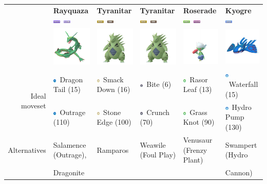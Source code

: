 \documentclass[8pt,aspectratio=169,compress]{beamer}
\newcommand{\darkfull}{\includegraphics[height=0.15cm]{../../images/type/full/Dark.png}}
\newcommand{\flyingfull}{\includegraphics[height=0.15cm]{../../images/type/full/Flying.png}}
\newcommand{\dragonfull}{\includegraphics[height=0.15cm]{../../images/type/full/Dragon.png}}
\newcommand{\grassfull}{\includegraphics[height=0.15cm]{../../images/type/full/Grass.png}}
\newcommand{\rockfull}{\includegraphics[height=0.15cm]{../../images/type/full/Rock.png}}
\newcommand{\waterfull}{\includegraphics[height=0.15cm]{../../images/type/full/Water.png}}
\newcommand{\poisonfull}{\includegraphics[height=0.15cm]{../../images/type/full/Poison.png}}
\newcommand{\dragonsimp}{\includegraphics[height=0.15cm]{../../images/type/simplified/dragon.png}}
\newcommand{\darksimp}{\includegraphics[height=0.15cm]{../../images/type/simplified/dark.png}}
\newcommand{\rocksimp}{\includegraphics[height=0.15cm]{../../images/type/simplified/rock.png}}
\newcommand{\watersimp}{\includegraphics[height=0.15cm]{../../images/type/simplified/water.png}}
\newcommand{\grasssimp}{\includegraphics[height=0.15cm]{../../images/type/simplified/grass.png}}
\begin{document}
\begin{frame}
\begin{tiny}
\begin{block}{}
\begin{center}
\bigskip

\begin{tabular}{rp{2cm}p{2cm}p{2cm}p{2cm}p{2cm}} 
    & \textbf{Rayquaza} \hfill \dragonfull~\flyingfull &  \textbf{Tyranitar} \hfill \rockfull~\darkfull &  \textbf{Tyranitar} \hfill \rockfull~\darkfull  &  \textbf{Roserade} \hfill \grassfull~\poisonfull  & \textbf{Kyogre} \hfill  \waterfull \\ 
    &  \multicolumn{1}{c}{\includegraphics[width=2cm]{../../images/pokemon/Rayquaza}} &   \multicolumn{1}{c}{\includegraphics[width=2cm]{../../images/pokemon/Tyranitar} }  &   \multicolumn{1}{c}{\includegraphics[width=2cm]{../../images/pokemon/Tyranitar} }   &   \multicolumn{1}{c}{\includegraphics[width=2cm]{../../images/pokemon/Roserade} }   &   \multicolumn{1}{c}{\includegraphics[width=2cm]{../../images/pokemon/Kyogre} } \\ \hline
\multirow{2}{*}{Ideal moveset}   & \dragonsimp~Dragon Tail (15) & \rocksimp~Smack Down (16)  & \darksimp~Bite (6)& \grasssimp~Rasor Leaf (13) & \watersimp~Waterfall (15) \\
    &\dragonsimp~Outrage (110) &\rocksimp~Stone Edge (100) & \darksimp~Crunch (70)& \grasssimp~Grass Knot (90) & \watersimp~Hydro Pump (130)  \\  \hline  
Alternatives & Salamence (Outrage),  & Ramparos & Weawile (Foul Play) & Venusaur (Frenzy Plant) & Swampert (Hydro  \\
 & Dragonite & & & & Cannon)
\end{tabular}   


\end{center}
\end{block}
\end{tiny}
\end{frame}
\end{document}
